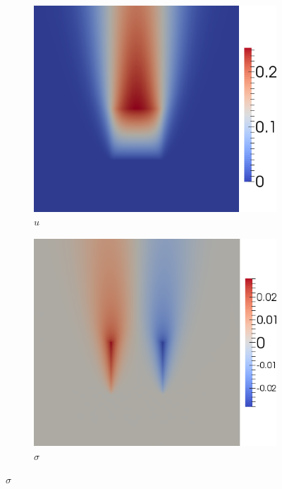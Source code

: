 \documentclass[preprint,12pt]{elsarticle}
\begin{document}
\begin{figure}[!ht]
\centering
\begin{subfigure}[t]{0.45\textwidth}
\centering
\includegraphics[width=\textwidth]{SpaceTimeHeat/PulseSource/u.png}
\caption{$u$}
\label{fig:spaceTimeHeatu}
\end{subfigure}
\begin{subfigure}[t]{0.45\textwidth}
\centering
\includegraphics[width=\textwidth]{SpaceTimeHeat/PulseSource/sigma.png}
\caption{$\sigma$}
\label{fig:spaceTimeHeatsigma}

\end{subfigure}
\end{figure}
\end{document}
